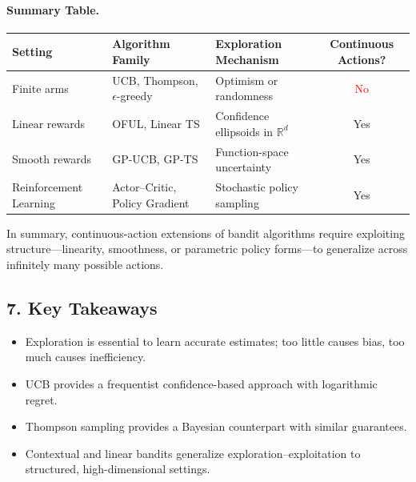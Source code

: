 \documentclass[12pt]{article}
\begin{document}
\paragraph{Summary Table.}
\begin{center}
		\small
		\begin{tabularx}{\linewidth}{|l|X|X|c|}
				\hline
				\textbf{Setting} & \textbf{Algorithm Family} & \textbf{Exploration Mechanism} &
				\textbf{Continuous Actions?} \\
				\hline
				Finite arms & UCB, Thompson, $\epsilon$-greedy & Optimism or randomness & \textcolor{red}{No} \\
				\hline
				Linear rewards & OFUL, Linear TS & Confidence ellipsoids in $\mathbb{R}^d$ &
				\textcolor{green!50!black}{Yes} \\
				\hline
				Smooth rewards & GP-UCB, GP-TS & Function-space uncertainty & \textcolor{green!50!black}{Yes} \\
				\hline
				Reinforcement Learning & Actor--Critic, Policy Gradient & Stochastic policy sampling
				& \textcolor{green!50!black}{Yes} \\
				\hline
		\end{tabularx}
\end{center}

In summary, continuous-action extensions of bandit algorithms require exploiting
structure---linearity, smoothness, or parametric policy forms---to generalize across
infinitely many possible actions.
\subsection*{7. Key Takeaways}
\begin{itemize}
		\item Exploration is essential to learn accurate estimates; too little causes bias, too
				much causes inefficiency.
		\item UCB provides a frequentist confidence-based approach with logarithmic regret.
		\item Thompson sampling provides a Bayesian counterpart with similar guarantees.
		\item Contextual and linear bandits generalize exploration--exploitation to structured,
				high-dimensional settings.
\end{itemize}
\end{document}
